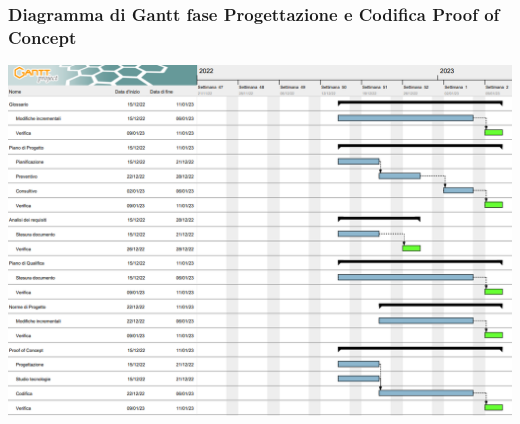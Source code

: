 \subsubsection{Diagramma di Gantt fase Progettazione e Codifica Proof of Concept}
\includegraphics[scale=0.75]{image/gantt_secondo_periodo.png}
